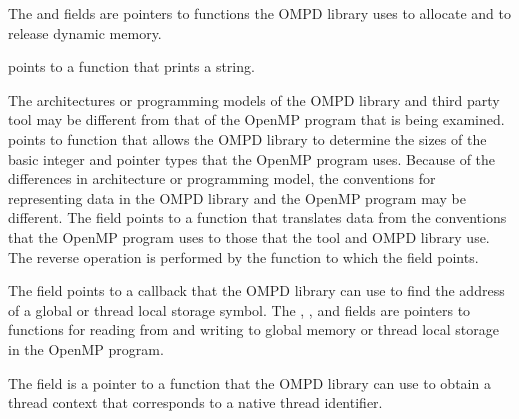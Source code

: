 The  and  fields are pointers to functions 
the OMPD library uses to allocate and to release dynamic memory.

 points to a function that prints a string.

The architectures or programming models of the OMPD library and third party 
tool may be different from that of the OpenMP program that is being examined.
 points to function that allows the OMPD library to determine 
the sizes of the basic integer and pointer types that the OpenMP program uses.
Because of the differences in architecture or programming model, the conventions 
for representing data in the OMPD library and the OpenMP program may be different.
The  field points to a function that translates data from the 
conventions that the OpenMP program uses to those that the tool and OMPD library
use. The reverse operation is performed by the function to which the 
 field points.

The  field points to a callback that the OMPD library 
can use to find the address of a global or thread local storage symbol. The 
, , and  fields are 
pointers to functions for reading from and writing to global memory or 
thread local storage in the OpenMP program.

The  field is a pointer to a function
that the OMPD library can use to obtain a thread context that corresponds to
a native thread identifier.

